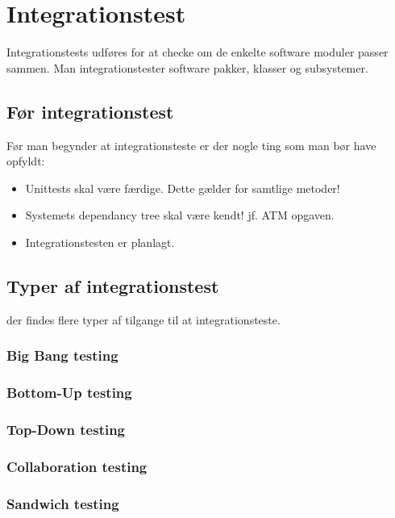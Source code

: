 \section{Integrationstest}
Integrationstests udføres for at checke om de enkelte software moduler passer sammen. Man integrationstester software pakker, klasser og subsystemer.

\subsection{Før integrationstest}
Før man begynder at integrationsteste er der nogle ting som man bør have opfyldt:
\begin{itemize}
	\item Unittests skal være færdige. Dette gælder for samtlige metoder!
	\item Systemets dependancy tree skal være kendt! jf. ATM opgaven.
	\item Integrationstesten er planlagt.
\end{itemize}

\subsection{Typer af integrationstest}
der findes flere typer af tilgange til at integrationsteste.

\subsubsection{Big Bang testing}

\subsubsection{Bottom-Up testing}

\subsubsection{Top-Down testing}

\subsubsection{Collaboration testing}

\subsubsection{Sandwich testing}